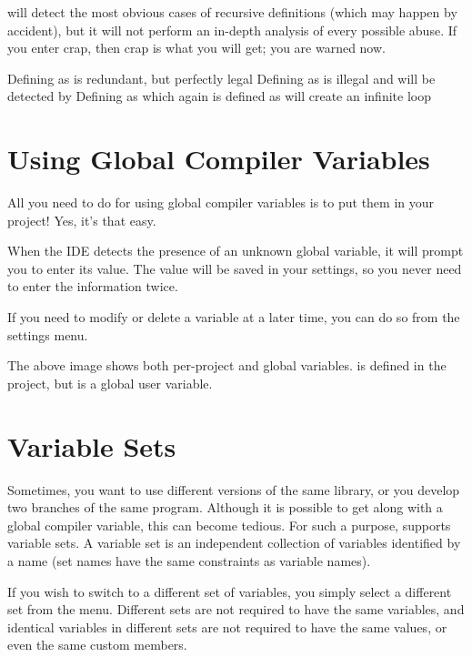 \codeblocks will detect the most obvious cases of recursive definitions (which may happen by accident), but it will not perform an in-depth analysis of every possible abuse. If you enter crap, then crap is what you will get; you are warned now.


Defining  as  is redundant, but perfectly legal
Defining  as  is illegal and will be detected by \codeblocks
Defining  as  which again is defined as  will create an infinite loop

\section{Using Global Compiler Variables}

All you need to do for using global compiler variables is to put them in your project! Yes, it's that easy.

When the IDE detects the presence of an unknown global variable, it will prompt you to enter its value. The value will be saved in your settings, so you never need to enter the information twice.

If you need to modify or delete a variable at a later time, you can do so from the settings menu.




The above image shows both per-project and global variables.  is defined in the project, but  is a global user variable.

\section{Variable Sets}

Sometimes, you want to use different versions of the same library, or you develop two branches of the same program. Although it is possible to get along with a global compiler variable, this can become tedious. For such a purpose, \codeblocks supports variable sets. A variable set is an independent collection of variables identified by a name (set names have the same constraints as variable names).

If you wish to switch to a different set of variables, you simply select a different set from the menu. Different sets are not required to have the same variables, and identical variables in different sets are not required to have the same values, or even the same custom members.

